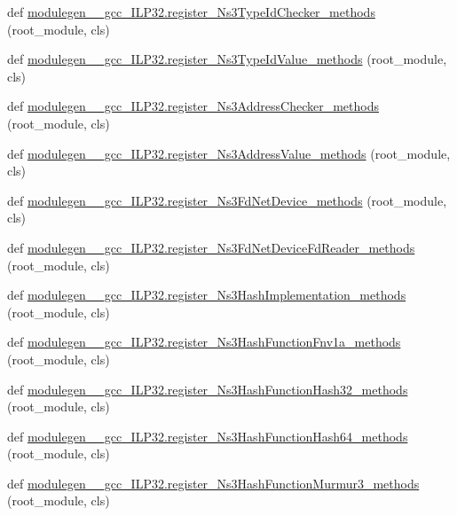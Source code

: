 \begin{DoxyCompactItemize}
\item 
def \hyperlink{namespacemodulegen____gcc__ILP32_a8cc76f23a8cb33ad3a0e4d77e8fbee0a}{modulegen\+\_\+\+\_\+gcc\+\_\+\+I\+L\+P32.\+register\+\_\+\+Ns3\+Type\+Id\+Checker\+\_\+methods} (root\+\_\+module, cls)
\item 
def \hyperlink{namespacemodulegen____gcc__ILP32_a39c112d1c935b295e15786cb622c73a5}{modulegen\+\_\+\+\_\+gcc\+\_\+\+I\+L\+P32.\+register\+\_\+\+Ns3\+Type\+Id\+Value\+\_\+methods} (root\+\_\+module, cls)
\item 
def \hyperlink{namespacemodulegen____gcc__ILP32_a6cddc7786a1240bac0c2c11d2e5e40f3}{modulegen\+\_\+\+\_\+gcc\+\_\+\+I\+L\+P32.\+register\+\_\+\+Ns3\+Address\+Checker\+\_\+methods} (root\+\_\+module, cls)
\item 
def \hyperlink{namespacemodulegen____gcc__ILP32_a73078c37ac27c6fd2ec5e6a012ec4c0d}{modulegen\+\_\+\+\_\+gcc\+\_\+\+I\+L\+P32.\+register\+\_\+\+Ns3\+Address\+Value\+\_\+methods} (root\+\_\+module, cls)
\item 
def \hyperlink{namespacemodulegen____gcc__ILP32_a83ac7091a12c64d67ad53efaa2bb34bc}{modulegen\+\_\+\+\_\+gcc\+\_\+\+I\+L\+P32.\+register\+\_\+\+Ns3\+Fd\+Net\+Device\+\_\+methods} (root\+\_\+module, cls)
\item 
def \hyperlink{namespacemodulegen____gcc__ILP32_a2b2f0bd4284f9b82c4e40e569e5af68b}{modulegen\+\_\+\+\_\+gcc\+\_\+\+I\+L\+P32.\+register\+\_\+\+Ns3\+Fd\+Net\+Device\+Fd\+Reader\+\_\+methods} (root\+\_\+module, cls)
\item 
def \hyperlink{namespacemodulegen____gcc__ILP32_acbacaf626a5a437cc46ab734cfde3cb8}{modulegen\+\_\+\+\_\+gcc\+\_\+\+I\+L\+P32.\+register\+\_\+\+Ns3\+Hash\+Implementation\+\_\+methods} (root\+\_\+module, cls)
\item 
def \hyperlink{namespacemodulegen____gcc__ILP32_a8a8387218e2c3d882054e6b56a6a4b07}{modulegen\+\_\+\+\_\+gcc\+\_\+\+I\+L\+P32.\+register\+\_\+\+Ns3\+Hash\+Function\+Fnv1a\+\_\+methods} (root\+\_\+module, cls)
\item 
def \hyperlink{namespacemodulegen____gcc__ILP32_afac315fff05eebcf56ca0655484fb790}{modulegen\+\_\+\+\_\+gcc\+\_\+\+I\+L\+P32.\+register\+\_\+\+Ns3\+Hash\+Function\+Hash32\+\_\+methods} (root\+\_\+module, cls)
\item 
def \hyperlink{namespacemodulegen____gcc__ILP32_a5bb0479ce8e16c48c18c0b8db959d57b}{modulegen\+\_\+\+\_\+gcc\+\_\+\+I\+L\+P32.\+register\+\_\+\+Ns3\+Hash\+Function\+Hash64\+\_\+methods} (root\+\_\+module, cls)
\item 
def \hyperlink{namespacemodulegen____gcc__ILP32_aac40fb7a316e95e431da9cf4c6a3e3a0}{modulegen\+\_\+\+\_\+gcc\+\_\+\+I\+L\+P32.\+register\+\_\+\+Ns3\+Hash\+Function\+Murmur3\+\_\+methods} (root\+\_\+module, cls)

\end{DoxyCompactItemize}

